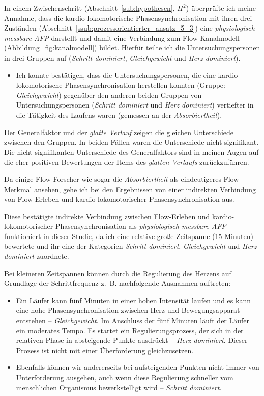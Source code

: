 In einem Zwischenschritt (Abschnitt~\ref{sub:hypothesen}, $H^2$) überprüfte ich meine Annahme, dass die kardio-lokomotorische Phasensynchronisation mit ihren drei Zuständen (Abschnitt~\ref{ssub:prozessorientierter_ansatz_5_3}) eine \emph{physiologisch messbare \ac{AFP}} darstellt und damit eine Verbindung zum Flow-Kanalmodell (Abbildung~\ref{fig:kanalmodell}) bildet. Hierfür teilte ich die Untersuchungspersonen in drei Gruppen auf (\emph{Schritt dominiert}, \emph{Gleichgewicht} und \emph{Herz dominiert}).
\begin{itemize}
	
	\item Ich konnte bestätigen, dass die Untersuchungspersonen, die eine kardio-lokomotorische Phasensynchronisation herstellen konnten (Gruppe: \emph{Gleichgewicht}) gegenüber den anderen beiden Gruppen von Untersuchungspersonen (\emph{Schritt dominiert} und \emph{Herz dominiert}) vertiefter in die Tätigkeit des Laufens waren (gemessen an der \emph{Absorbiertheit}).
\end{itemize}

Der Generalfaktor und der \emph{glatte Verlauf} zeigen die gleichen Unterschiede zwischen den Gruppen. In beiden Fällen waren die Unterschiede nicht signifikant. Die nicht signifikanten Unterschiede des Generalfaktors sind in meinen Augen auf die eher positiven Bewertungen der Items des \emph{glatten Verlaufs} zurückzuführen. 

Da einige Flow-Forscher wie \citet{Peifer2014} sogar die \emph{Absorbiertheit} als eindeutigeres Flow-Merkmal ansehen, gehe ich bei den Ergebnissen von einer indirekten Verbindung von Flow-Erleben und kardio-lokomotorischer Phasensynchronisation aus. 

Diese bestätigte indirekte Verbindung zwischen Flow-Erleben und kardio-lokomotorischer Phasensynchronisation als \emph{physiologisch messbare \ac{AFP}} funktioniert in dieser Studie, da ich eine relative große Zeitspanne (15 Minuten) bewertete und ihr eine der Kategorien \emph{Schritt dominiert}, \emph{Gleichgewicht} und \emph{Herz dominiert} zuordnete.

Bei kleineren Zeitspannen können durch die Regulierung des Herzens auf Grundlage der Schrittfrequenz z.~B. nachfolgende Ausnahmen auftreten: 
\begin{itemize}
	
	\item Ein Läufer kann fünf Minuten in einer hohen Intensität laufen und es kann eine hohe Phasensynchronisation zwischen Herz  und Bewegungsapparat entstehen -- \emph{Gleichgewicht}. Im Anschluss der fünf Minuten läuft der Läufer ein moderates Tempo. Es startet ein Regulierungsprozess, der sich in der relativen Phase in absteigende Punkte ausdrückt -- \emph{Herz dominiert}. Dieser Prozess ist nicht mit einer Überforderung gleichzusetzen.
	
	\item Ebenfalls können wir andererseits bei aufsteigenden Punkten nicht immer von Unterforderung ausgehen, auch wenn diese Regulierung schneller vom menschlichen Organismus bewerkstelligt wird -- \emph{Schritt dominiert}.
\end{itemize}

